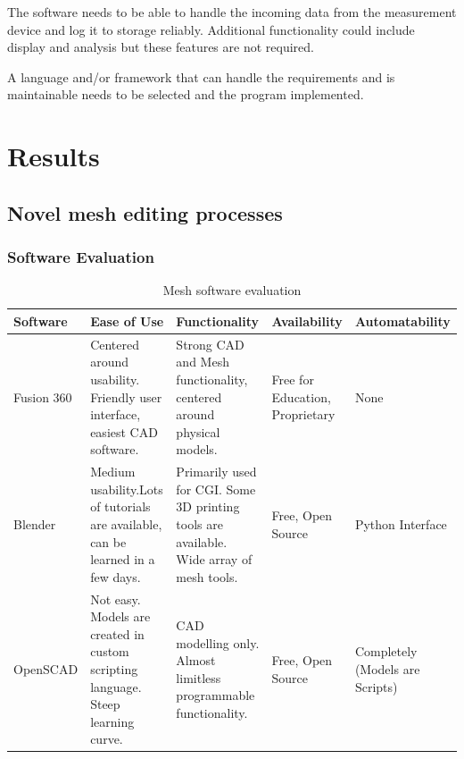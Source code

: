 \documentclass[MME,Projekt,english]{twbook}%
\begin{document}
The software needs to be able to handle the incoming data from the measurement device and log it
to storage reliably. Additional functionality could include display and analysis but these features are not required.

A language and/or framework that can handle the requirements and is maintainable needs to be selected and the
program implemented.

\newpage
\chapter{Results}

\section{Novel mesh editing processes}

\subsection{Software Evaluation}
\begin{table}[h]
	\caption{Mesh software evaluation}\label{mse}
	\begin{tabular}{|p{}|p{}|p{}|p{}|p{}|}
	\hline
	\textbf{Software}   & \textbf{Ease of Use}                                                                      & \textbf{Functionality}                                                                           & \textbf{Availability}                    & \textbf{Automatability}                  \\ \hline
	Fusion 360 & Centered around usability. Friendly user interface, easiest CAD software.        & Strong CAD and Mesh functionality, centered around physical models.                     & Free for Education, Proprietary & None                            \\ \hline
	Blender    & Medium usability.Lots of tutorials are available, can be learned in a few days. & Primarily used for CGI. Some 3D printing tools are available. Wide array of mesh tools. & Free, Open Source               & Python Interface                \\ \hline
	OpenSCAD   & Not easy. Models are created in custom scripting language. Steep learning curve. & CAD modelling only. Almost limitless programmable functionality.                        & Free, Open Source               & Completely (Models are Scripts) \\ \hline
	\end{tabular}
\end{table}
\end{document}
